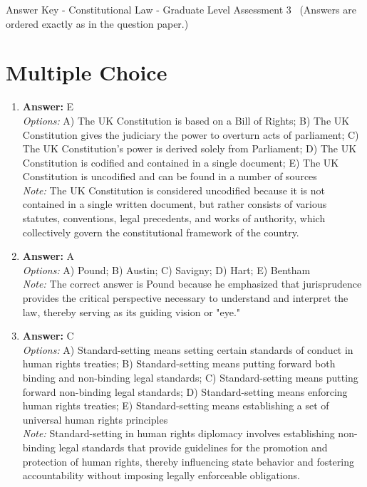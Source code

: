 \documentclass[12pt]{article}
\begin{document}
\begin{center}
Answer Key - Constitutional Law - Graduate Level Assessment 3 \
\small (Answers are ordered exactly as in the question paper.)
\end{center}

\section*{Multiple Choice}
\begin{enumerate}[label=\arabic*.]
\item \textbf{Answer:} E
\\ \textit{Options:} A) The UK Constitution is based on a Bill of Rights; B) The UK Constitution gives the judiciary the power to overturn acts of parliament; C) The UK Constitution's power is derived solely from Parliament; D) The UK Constitution is codified and contained in a single document; E) The UK Constitution is uncodified and can be found in a number of sources
\\ \textit{Note:} The UK Constitution is considered uncodified because it is not contained in a single written document, but rather consists of various statutes, conventions, legal precedents, and works of authority, which collectively govern the constitutional framework of the country.
\item \textbf{Answer:} A
\\ \textit{Options:} A) Pound; B) Austin; C) Savigny; D) Hart; E) Bentham
\\ \textit{Note:} The correct answer is Pound because he emphasized that jurisprudence provides the critical perspective necessary to understand and interpret the law, thereby serving as its guiding vision or "eye."
\item \textbf{Answer:} C
\\ \textit{Options:} A) Standard-setting means setting certain standards of conduct in human rights treaties; B) Standard-setting means putting forward both binding and non-binding legal standards; C) Standard-setting means putting forward non-binding legal standards; D) Standard-setting means enforcing human rights treaties; E) Standard-setting means establishing a set of universal human rights principles
\\ \textit{Note:} Standard-setting in human rights diplomacy involves establishing non-binding legal standards that provide guidelines for the promotion and protection of human rights, thereby influencing state behavior and fostering accountability without imposing legally enforceable obligations.

\end{enumerate}
\end{document}
